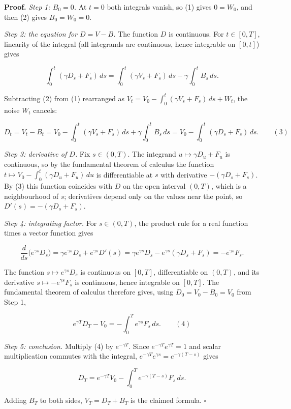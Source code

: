 \documentclass[11pt,a4paper]{article}
\begin{document}
\textbf{Proof.} \emph{Step 1: \(B_0=0\).} At \(t=0\) both integrals vanish, so (1) gives \(0=W_0\), and then (2) gives \(B_0=W_0=0\).




\emph{Step 2: the equation for \(D=V-B\).} The function \(D\) is continuous. For \(t\in[0,T]\), linearity of the integral (all integrands are continuous, hence integrable on \([0,t]\)) gives


\[\int_0^t(\gamma D_s+F_s)\,ds=\int_0^t(\gamma V_s+F_s)\,ds-\gamma\int_0^tB_s\,ds .\]


Subtracting (2) from (1) rearranged as \(V_t=V_0-\int_0^t(\gamma V_s+F_s)\,ds+W_t\), the noise \(W_t\) cancels:


\[D_t=V_t-B_t=V_0-\int_0^t(\gamma V_s+F_s)\,ds+\gamma\int_0^tB_s\,ds=V_0-\int_0^t(\gamma D_s+F_s)\,ds .\qquad(3)\]


\emph{Step 3: derivative of \(D\).} Fix \(s\in(0,T)\). The integrand \(u\mapsto\gamma D_u+F_u\) is continuous, so by the fundamental theorem of calculus the function \(t\mapsto V_0-\int_0^t(\gamma D_u+F_u)\,du\) is differentiable at \(s\) with derivative \(-(\gamma D_s+F_s)\). By (3) this function coincides with \(D\) on the open interval \((0,T)\), which is a neighbourhood of \(s\); derivatives depend only on the values near the point, so \(D'(s)=-(\gamma D_s+F_s)\).




\emph{Step 4: integrating factor.} For \(s\in(0,T)\), the product rule for a real function times a vector function gives


\[\frac{d}{ds}\bigl(e^{\gamma s}D_s\bigr)=\gamma e^{\gamma s}D_s+e^{\gamma s}D'(s)=\gamma e^{\gamma s}D_s-e^{\gamma s}(\gamma D_s+F_s)=-e^{\gamma s}F_s .\]


The function \(s\mapsto e^{\gamma s}D_s\) is continuous on \([0,T]\), differentiable on \((0,T)\), and its derivative \(s\mapsto-e^{\gamma s}F_s\) is continuous, hence integrable on \([0,T]\). The fundamental theorem of calculus therefore gives, using \(D_0=V_0-B_0=V_0\) from Step 1,


\[e^{\gamma T}D_T-V_0=-\int_0^Te^{\gamma s}F_s\,ds .\qquad(4)\]


\emph{Step 5: conclusion.} Multiply (4) by \(e^{-\gamma T}\). Since \(e^{-\gamma T}e^{\gamma T}=1\) and scalar multiplication commutes with the integral, \(e^{-\gamma T}e^{\gamma s}=e^{-\gamma(T-s)}\) gives


\[D_T=e^{-\gamma T}V_0-\int_0^Te^{-\gamma(T-s)}F_s\,ds .\]


Adding \(B_T\) to both sides, \(V_T=D_T+B_T\) is the claimed formula. \(\square\)
\end{document}
